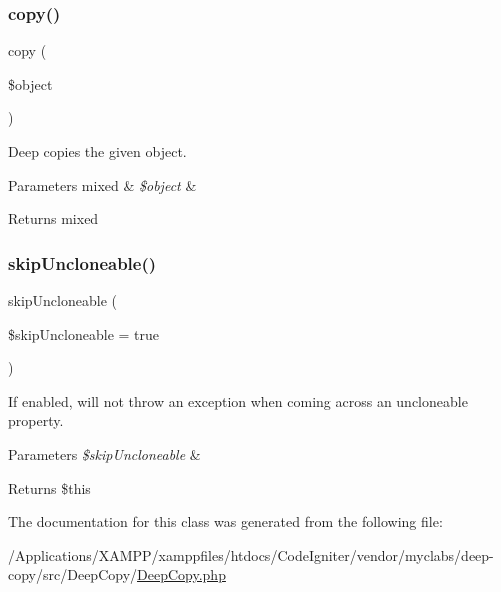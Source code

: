 \mbox{\label{class_deep_copy_1_1_deep_copy_a07abdb9b8e783676fd376c8877ada3dc}} 
\subsubsection{\texorpdfstring{copy()}{copy()}}
{\footnotesize\ttfamily copy (\begin{DoxyParamCaption}\item[{}]{\$object }\end{DoxyParamCaption})}

Deep copies the given object.


\begin{DoxyParams}[1]{Parameters}
mixed & {\em \$object} & \\
\hline
\end{DoxyParams}
\begin{DoxyReturn}{Returns}
mixed 
\end{DoxyReturn}
\mbox{\label{class_deep_copy_1_1_deep_copy_a76680d861cd7d4c7604672146b101cbf}} 
\subsubsection{\texorpdfstring{skip\+Uncloneable()}{skipUncloneable()}}
{\footnotesize\ttfamily skip\+Uncloneable (\begin{DoxyParamCaption}\item[{}]{\$skip\+Uncloneable = {\ttfamily true} }\end{DoxyParamCaption})}

If enabled, will not throw an exception when coming across an uncloneable property.


\begin{DoxyParams}{Parameters}
{\em \$skip\+Uncloneable} & \\
\hline
\end{DoxyParams}
\begin{DoxyReturn}{Returns}
\$this 
\end{DoxyReturn}


The documentation for this class was generated from the following file\+:\begin{DoxyCompactItemize}
\item 
/\+Applications/\+X\+A\+M\+P\+P/xamppfiles/htdocs/\+Code\+Igniter/vendor/myclabs/deep-\/copy/src/\+Deep\+Copy/\mbox{\hyperlink{_deep_copy_8php}{Deep\+Copy.\+php}}\end{DoxyCompactItemize}
